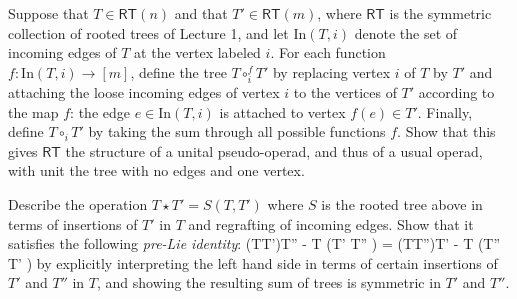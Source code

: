 \documentclass[fleqn, a4paper, twoside]{article}
\makeatletter
\newcommand{\0}{\langle 0\rangle}
\let\[\@undefined
\DeclareRobustCommand{\[}{\begin{equation}}%
\let\]\@undefined
\DeclareRobustCommand{\]}{\end{equation}}%
\theoremstyle{mytheorem}
\theoremstyle{introthm}
\theoremstyle{mydefinition}
\theoremstyle{mydefinition2}
\theoremstyle{plain} %
\newcommand{\?}{\,?\,}
\theoremstyle{mytheorem}
\theoremstyle{plain} %
\makeatother
\begin{document}
\begin{question}
Suppose that $T\in\mathsf{RT}(n)$ and
that $T'\in \mathsf{RT}(m)$, where $\mathsf{RT}$
is the symmetric collection
 of rooted trees of Lecture 1,
and let $\mathrm{In}(T,i)$ denote the
set of incoming edges of $T$ at the
vertex labeled $i$. For each function
$f: \mathrm{In}(T,i)\longrightarrow [m]$,
define the tree $T\circ_i^f T'$ by
replacing vertex $i$ of $T$ by $T'$ and
attaching the loose incoming edges of 
vertex $i$ to the vertices of $T'$
according to the map $f$: the edge
$e\in \mathrm{In}(T,i)$ is attached
to vertex $f(e)\in T'$. Finally,
define $T\circ_i T'$ by taking the
sum through all possible functions
$f$. Show that this gives $\mathsf{RT}$
the structure of a unital pseudo-operad,
and thus of a usual operad, with unit
the tree with no edges and one vertex.
\end{question}


\begin{question}
 Describe the operation $T\star T' = S(T,T')$ where
$S$ is the rooted tree above in terms of 
insertions of $T'$ in $T$ and regrafting of incoming 
edges. Show that it satisfies the following \emph{pre-Lie
identity}:
\[
  (T\star T')\star T'' -  T \star (T' \star T'' ) =
    (T\star T'')\star T' -  T \star (T'' \star T' ) 
 	\]
 	by explicitly interpreting the left hand side in
 	terms of certain insertions of $T'$ and $T''$ in $T$,
 	and showing the resulting sum of trees is symmetric
 	in $T'$ and $T''$.

\end{question}
\end{document}
